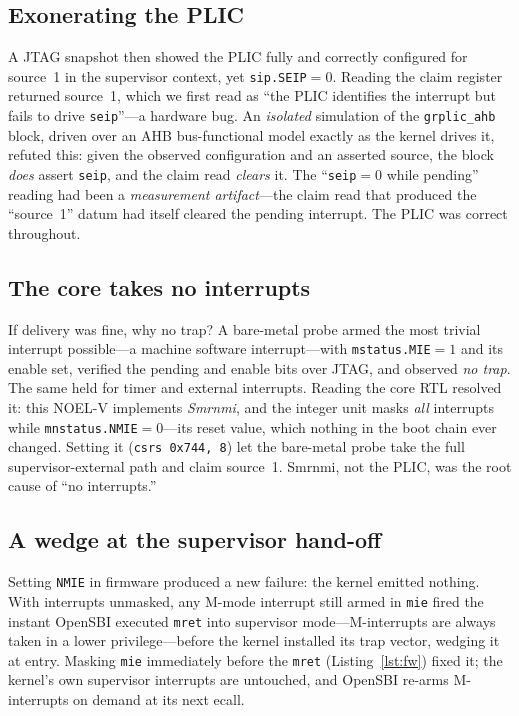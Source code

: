 \documentclass[conference,nofonttune]{IEEEtran}
\newcommand{\code}[1]{\texttt{#1}}
\newcommand{\reg}[1]{\texttt{#1}}
\begin{document}
\subsection{Exonerating the PLIC}
A JTAG snapshot then showed the PLIC fully and correctly configured for source~1
in the supervisor context, yet \reg{sip.SEIP}${=}0$. Reading the claim register
returned source~1, which we first read as ``the PLIC identifies the interrupt but
fails to drive \reg{seip}''---a hardware bug. An \emph{isolated} simulation of the
\code{grplic\_ahb} block, driven over an AHB bus-functional model exactly as the
kernel drives it, refuted this: given the observed configuration and an asserted
source, the block \emph{does} assert \reg{seip}, and the claim read \emph{clears}
it. The ``\reg{seip}${=}0$ while pending'' reading had been a \emph{measurement
artifact}---the claim read that produced the ``source~1'' datum had itself cleared
the pending interrupt. The PLIC was correct throughout.

\subsection{The core takes no interrupts}
If delivery was fine, why no trap? A bare-metal probe armed the most trivial
interrupt possible---a machine software interrupt---with \reg{mstatus.MIE}${=}1$
and its enable set, verified the pending and enable bits over JTAG, and observed
\emph{no trap}. The same held for timer and external interrupts. Reading the core
RTL resolved it: this NOEL-V implements \emph{Smrnmi}, and the integer unit masks
\emph{all} interrupts while \reg{mnstatus.NMIE}${=}0$---its reset value, which
nothing in the boot chain ever changed. Setting it (\code{csrs 0x744, 8}) let the
bare-metal probe take the full supervisor-external path and claim source~1.
Smrnmi, not the PLIC, was the root cause of ``no interrupts.''

\subsection{A wedge at the supervisor hand-off}
Setting \reg{NMIE} in firmware produced a new failure: the kernel emitted nothing.
With interrupts unmasked, any M-mode interrupt still armed in \reg{mie} fired the
instant OpenSBI executed \code{mret} into supervisor mode---M-interrupts are
always taken in a lower privilege---before the kernel installed its trap vector,
wedging it at entry. Masking \reg{mie} immediately before the \code{mret}
(Listing~\ref{lst:fw}) fixed it; the kernel's own supervisor interrupts are
untouched, and OpenSBI re-arms M-interrupts on demand at its next ecall.
\end{document}

